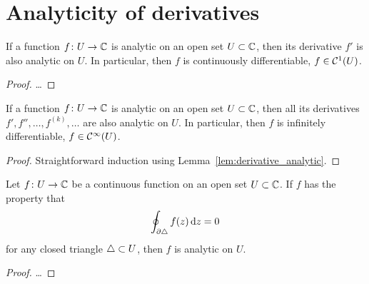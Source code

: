 \section{Analyticity of derivatives}

\begin{lemma}
  \label{lem:derivative_analytic}
  If a function $f \colon U \to \mathbb{C}$ is analytic on an open set $U \subset \mathbb{C}$,
  then its derivative $f'$ is also analytic on $U$.
  In particular, then $f$ is continuously differentiable,
  $f \in \mathcal{C}^{{1}}(U)$.
\end{lemma}
\begin{proof}
  \ldots
\end{proof}

\begin{corollary}
  \label{lem:higher_derivatives_analytic}
  If a function $f \colon U \to \mathbb{C}$ is analytic on an open set $U \subset \mathbb{C}$,
  then all its derivatives $f', f'', \ldots, f^{(k)}, \ldots$ are also analytic on $U$.
  In particular, then $f$ is infinitely differentiable,
  $f \in \mathcal{C}^{{\infty}}(U)$.
\end{corollary}
\begin{proof}
  Straightforward induction using Lemma~\ref{lem:derivative_analytic}.
\end{proof}

\begin{theorem}
  \label{thm:morera}
  Let $f \colon U \to \mathbb{C}$ be a continuous function on an open set $U \subset \mathbb{C}$.
  If $f$ has the property that
  \begin{align*}
    \oint_{\partial \triangle} f(z) \, \mathrm{d} z = 0
  \end{align*}
  for any closed triangle $\triangle \subset U$, then $f$ is analytic on $U$.
\end{theorem}
\begin{proof}
  \ldots
\end{proof}

